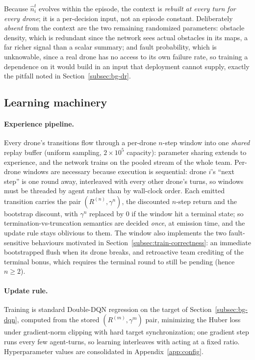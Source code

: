 Because $\hat n_i^t$ evolves within the episode, the context is \emph{rebuilt at
every turn for every drone}; it is a per-decision input, not an episode constant.
Deliberately \emph{absent} from the context are the two remaining randomized
parameters: obstacle density, which is redundant since the network sees actual
obstacles in its maps, a far richer signal than a scalar summary; and fault
probability, which is unknowable, since a real drone has no access to its own
failure rate, so training a dependence on it would build in an input that
deployment cannot supply, exactly the pitfall noted in
Section~\ref{subsec:bg-dr}.

\subsection{Learning machinery}
\label{subsec:arch-learning}

\paragraph{Experience pipeline.}
Every drone's transitions flow through a per-drone $n$-step window into one
\emph{shared} replay buffer (uniform sampling, $2\times10^5$ capacity):
parameter sharing extends to experience, and the network trains on the pooled
stream of the whole team. Per-drone windows are necessary because execution is
sequential: drone $i$'s ``next step'' is one round away, interleaved with every
other drone's turns, so windows must be threaded by agent rather than by
wall-clock order. Each emitted transition carries the pair
$(R^{(n)}, \gamma^n)$, the discounted $n$-step return and the bootstrap discount,
with $\gamma^n$ replaced by $0$ if the window hit a terminal state; so
termination-vs-truncation semantics are decided \emph{once}, at emission time,
and the update rule stays oblivious to them. The window also implements the two
fault-sensitive behaviours motivated in Section~\ref{subsec:train-correctness}:
an immediate bootstrapped flush when its drone breaks, and retroactive team
crediting of the terminal bonus, which requires the terminal round to still be
pending (hence $n \geq 2$).

\paragraph{Update rule.}
Training is standard Double-DQN regression on the target of
Section~\ref{subsec:bg-dqn}, computed from the stored $(R^{(m)}, \gamma^m)$ pair,
minimizing the Huber loss under gradient-norm clipping with hard target
synchronization; one gradient step runs every few agent-turns, so learning
interleaves with acting at a fixed ratio. Hyperparameter values are consolidated
in Appendix~\ref{app:config}.

